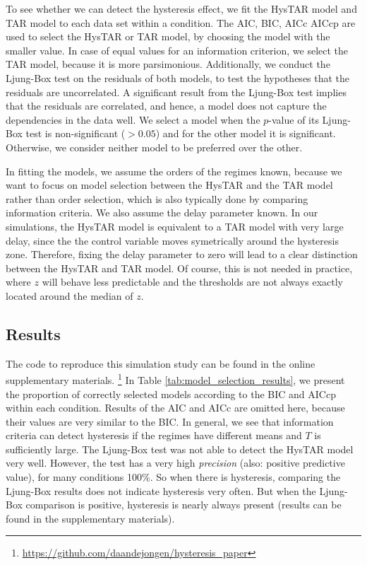 \documentclass{article}
\begin{document}
To see whether we can detect the hysteresis effect, we fit the HysTAR model and TAR model to each data set within a condition.
The AIC, BIC, AICc AICcp are used to select the HysTAR or TAR model, by choosing the model with the smaller value.
In case of equal values for an information criterion, we select the TAR model, because it is more parsimonious. 
Additionally, we conduct the Ljung-Box test on the residuals of both models, to test the hypotheses that the residuals are uncorrelated.
A significant result from the Ljung-Box test implies that the residuals are correlated, and hence, a model does not capture the dependencies in the data well.
We select a model when the $p$-value of its Ljung-Box test is non-significant ($>0.05$) and for the other model it is significant. Otherwise, we consider neither model to be preferred over the other.

In fitting the models, we assume the orders of the regimes known, because we want to focus on model selection between the HysTAR and the TAR model rather than order selection, which is also typically done by comparing information criteria. 
We also assume the delay parameter known. 
In our simulations, the HysTAR model is equivalent to a TAR model with very large delay, since the the control variable moves symetrically around the hysteresis zone.
Therefore, fixing the delay parameter to zero will lead to a clear distinction between the HysTAR and TAR model.
Of course, this is not needed in practice, where $z$ will behave less predictable and the thresholds are not always exactly located around the median of $z$.

\subsection{Results}
\label{sec:model_selection_results}
The code to reproduce this simulation study can be found in the online supplementary materials.
\footnote{\url{https://github.com/daandejongen/hysteresis_paper}}
In Table \ref{tab:model_selection_results}, we present the proportion of correctly selected models according to the BIC and AICcp within each condition. Results of the AIC and AICc are omitted here, because their values are very similar to the BIC. In general, we see that information criteria can detect hysteresis if the regimes have different means and $T$ is sufficiently large. 
The Ljung-Box test was not able to detect the HysTAR model very well. However, the test has a very high \textit{precision} (also: positive predictive value), for many conditions 100\%. So when there is hysteresis, comparing the Ljung-Box results does not indicate hysteresis very often. But when the Ljung-Box comparison is positive, hysteresis is nearly always present (results can be found in the supplementary materials).
\end{document}
